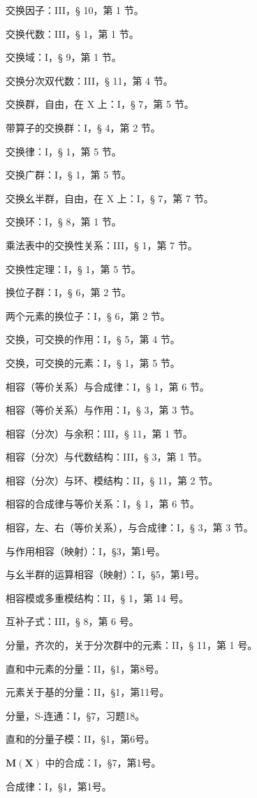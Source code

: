 交换因子：III，§ 10，第 1 节。

交换代数：III，§ 1，第 1 节。

交换域：I，§ 9，第 1 节。

交换分次双代数：III，§ 11，第 4 节。

交换群，自由，在 X 上：I，§ 7，第 5 节。

带算子的交换群：I，§ 4，第 2 节。

交换律：I，§ 1，第 5 节。

交换广群：I，§ 1，第 5 节。

交换幺半群，自由，在 X 上：I，§ 7，第 7 节。

交换环：I，§ 8，第 1 节。

乘法表中的交换性关系：III，§ 1，第 7 节。

交换性定理：I，§ 1，第 5 节。

换位子群：I，§ 6，第 2 节。

两个元素的换位子：I，§ 6，第 2 节。

交换，可交换的作用：I，§ 5，第 4 节。

交换，可交换的元素：I，§ 1，第 5 节。

相容（等价关系）与合成律：I，§ 1，第 6 节。

相容（等价关系）与作用：I，§ 3，第 3 节。

相容（分次）与余积：III，§ 11，第 1 节。

相容（分次）与代数结构：III，§ 3，第 1 节。

相容（分次）与环、模结构：II，§ 11，第 2 节。

相容的合成律与等价关系：I，§ 1，第 6 节。

相容，左、右（等价关系），与合成律：I，§ 3，第 3 节。

与作用相容（映射）：I，§3，第1号。

与幺半群的运算相容（映射）：I，§5，第1号。

相容模或多重模结构：II，§ 1，第 14 号。

互补子式：III，§ 8，第 6 号。

分量，齐次的，关于分次群中的元素：II，§ 11，第 1 号。

直和中元素的分量：II，§1，第8号。

元素关于基的分量：II，§1，第11号。

分量，S-连通：I，§7，习题18。

直和的分量子模：II，§1，第6号。

\(\mathbf{M}(\mathbf{X})\) 中的合成：I，§7，第1号。

合成律：I，§1，第1号。

